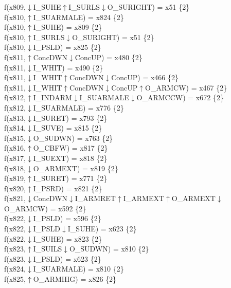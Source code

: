 f(x809,$\downarrow$I\_SUHE$\uparrow$I\_SURLS$\downarrow$O\_SURIGHT) = x51 \{2\} \\  
f(x810,$\uparrow$I\_SUARMALE) = x824 \{2\} \\  
f(x810,$\uparrow$I\_SUHE) = x809 \{2\} \\  
f(x810,$\uparrow$I\_SURLS$\downarrow$O\_SURIGHT) = x51 \{2\} \\  
f(x810,$\downarrow$I\_PSLD) = x825 \{2\} \\  
f(x811,$\uparrow$ConcDWN$\downarrow$ConcUP) = x480 \{2\} \\  
f(x811,$\downarrow$I\_WHIT) = x490 \{2\} \\  
f(x811,$\downarrow$I\_WHIT$\uparrow$ConcDWN$\downarrow$ConcUP) = x466 \{2\} \\  
f(x811,$\downarrow$I\_WHIT$\uparrow$ConcDWN$\downarrow$ConcUP$\uparrow$O\_ARMCW) = x467 \{2\} \\  
f(x812,$\uparrow$I\_INDARM$\downarrow$I\_SUARMALE$\downarrow$O\_ARMCCW) = x672 \{2\} \\  
f(x812,$\downarrow$I\_SUARMALE) = x776 \{2\} \\  
f(x813,$\downarrow$I\_SURET) = x793 \{2\} \\  
f(x814,$\downarrow$I\_SUVE) = x815 \{2\} \\  
f(x815,$\downarrow$O\_SUDWN) = x763 \{2\} \\  
f(x816,$\uparrow$O\_CBFW) = x817 \{2\} \\  
f(x817,$\downarrow$I\_SUEXT) = x818 \{2\} \\  
f(x818,$\downarrow$O\_ARMEXT) = x819 \{2\} \\  
f(x819,$\uparrow$I\_SURET) = x771 \{2\} \\  
f(x820,$\uparrow$I\_PSRD) = x821 \{2\} \\  
f(x821,$\downarrow$ConcDWN$\downarrow$I\_ARMRET$\uparrow$I\_ARMEXT$\uparrow$O\_ARMEXT$\downarrow$O\_ARMCW) = x592 \{2\} \\  
f(x822,$\downarrow$I\_PSLD) = x596 \{2\} \\  
f(x822,$\downarrow$I\_PSLD$\downarrow$I\_SUHE) = x623 \{2\} \\  
f(x822,$\downarrow$I\_SUHE) = x823 \{2\} \\  
f(x823,$\uparrow$I\_SUILS$\downarrow$O\_SUDWN) = x810 \{2\} \\  
f(x823,$\downarrow$I\_PSLD) = x623 \{2\} \\  
f(x824,$\downarrow$I\_SUARMALE) = x810 \{2\} \\  
f(x825,$\uparrow$O\_ARMHIG) = x826 \{2\} \\  
